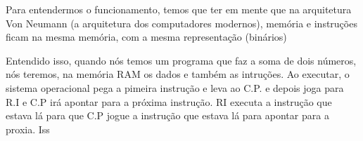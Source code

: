 \documentclass[12pt,a4paper]{report}
\begin{document}
	Para entendermos o funcionamento, temos que ter em mente que na arquitetura Von Neumann (a arquitetura dos computadores modernos), memória e instruções ficam na mesma memória, com a mesma representação (binários)
	
	Entendido isso, quando nós temos um programa que faz a soma de dois números, nós teremos, na memória RAM os dados e também as intruções. Ao executar, o sistema operacional pega a pimeira instrução e leva ao C.P. e depois joga para R.I e C.P irá apontar para a próxima instrução. RI executa a instrução que estava lá para que C.P jogue a instrução que estava lá para apontar para a proxia. Iss
	
	
\end{document}
